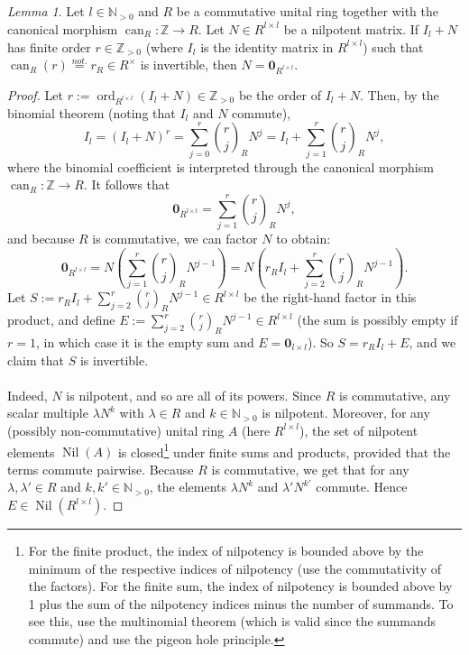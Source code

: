 \documentclass[11pt, a4paper, oneside]{article}
\theoremstyle{remark}
\theoremstyle{lemma}
\newtheorem*{lemma}{Lemma}
\begin{document}
\newpage
\subsection{}\label{A2}
\begin{lemma}
Let \( l \in \mathbb{N}_{>0} \) and \( R \) be a commutative unital ring together with the canonical morphism \( \operatorname{can}_{R}:\mathbb{Z} \rightarrow R \). Let \( N \in R^{l\times l} \) be a nilpotent matrix. If \( I_{l} + N \) has finite order \( r \in \mathbb{Z}_{>0} \) (where \( I_l \) is the identity matrix in \( R^{l\times l} \)) such that \( \operatorname{can}_{R}\left(r\right) \overset{not.}{=} r_{R} \in R^{\times} \) is invertible, then \( N = \mathbf{0}_{R^{l\times l}} \).
\end{lemma}

\begin{proof}
Let \( r := \operatorname{ord}_{R^{l\times l}}\left(I_{l} + N\right) \in \mathbb{Z}_{>0} \) be the order of \( I_{l} + N \). Then, by the binomial theorem (noting that \( I_{l} \) and \( N \) commute),
\[
I_l = \left(I_l + N\right)^r = \sum_{j=0}^{r} \binom{r}{j}_{R} N^{j} = I_l + \sum_{j=1}^{r} \binom{r}{j}_{R} N^{j},
\]
where the binomial coefficient is interpreted through the canonical morphism \( \operatorname{can}_{R}:\mathbb{Z} \rightarrow R \). It follows that
\[
\mathbf{0}_{R^{l\times l}} = \sum_{j=1}^{r} \binom{r}{j}_{R} N^{j},
\]
and because \( R \) is commutative, we can factor \( N \) to obtain:
\[
\mathbf{0}_{R^{l\times l}} = N \left( \sum_{j=1}^{r} \binom{r}{j}_{R} N^{j-1} \right) = N \left( r_{R} I_{l} + \sum_{j=2}^{r} \binom{r}{j}_{R} N^{j-1} \right).
\]
Let \( S := r_{R} I_{l} + \sum_{j=2}^{r} \binom{r}{j}_{R} N^{j-1} \in R^{l\times l} \) be the right-hand factor in this product, and define \( E := \sum_{j=2}^{r} \binom{r}{j}_{R} N^{j-1} \in R^{l\times l} \) (the sum is possibly empty if \( r = 1 \), in which case it is the empty sum and \( E = \mathbf{0}_{l\times l} \)). So \( S = r_{R} I_l + E \), and we claim that \( S \) is invertible.
\\\\
Indeed, \( N \) is nilpotent, and so are all of its powers. Since \( R \) is commutative, any scalar multiple \( \lambda N^k \) with \( \lambda \in R \) and \( k \in \mathbb{N}_{>0} \) is nilpotent. Moreover, for any (possibly non-commutative) unital ring \( A \) (here \( R^{l \times l} \)), the set of nilpotent elements \( \operatorname{Nil}\left( A \right) \) is closed\footnote{For the finite product, the index of nilpotency is bounded above by the minimum of the respective indices of nilpotency (use the commutativity of the factors). For the finite sum, the index of nilpotency is bounded above by 1 plus the sum of the nilpotency indices minus the number of summands. To see this, use the multinomial theorem (which is valid since the summands commute) and use the pigeon hole principle.} under finite sums and products, provided that the terms commute pairwise. Because \( R \) is commutative, we get that for any \( \lambda, \lambda' \in R \) and \( k, k' \in \mathbb{N}_{>0} \), the elements \( \lambda N^k \) and \( \lambda' N^{k'} \) commute. Hence \( E \in \operatorname{Nil}\left(R^{l\times l}\right) \).

\end{proof}
\end{document}
